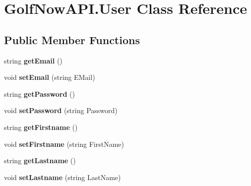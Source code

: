 \hypertarget{class_golf_now_a_p_i_1_1_user}{}\section{Golf\+Now\+A\+P\+I.\+User Class Reference}
\label{class_golf_now_a_p_i_1_1_user}
\subsection*{Public Member Functions}
\begin{DoxyCompactItemize}
\item 
\mbox{\label{class_golf_now_a_p_i_1_1_user_afcfd9d746f5d6c1c11f7cc7b5d950bd6}} 
string {\bfseries get\+Email} ()
\item 
\mbox{\label{class_golf_now_a_p_i_1_1_user_a98dcdeb86fcbbb00e965d834b9a8ce57}} 
void {\bfseries set\+Email} (string E\+Mail)
\item 
\mbox{\label{class_golf_now_a_p_i_1_1_user_a8db35d0fa78be9cd61525f66a8ac604a}} 
string {\bfseries get\+Password} ()
\item 
\mbox{\label{class_golf_now_a_p_i_1_1_user_a795f269d7d5e332e1602828a7090d8af}} 
void {\bfseries set\+Password} (string Password)
\item 
\mbox{\label{class_golf_now_a_p_i_1_1_user_ae1bf33898c6bea4b28ee14cb9d9b7ebb}} 
string {\bfseries get\+Firstname} ()
\item 
\mbox{\label{class_golf_now_a_p_i_1_1_user_a73b1ae6f350149454e0793cefe9d3d02}} 
void {\bfseries set\+Firstname} (string First\+Name)
\item 
\mbox{\label{class_golf_now_a_p_i_1_1_user_af5814ce45fd08688a3c05002ea3ef87a}} 
string {\bfseries get\+Lastname} ()
\item 
\mbox{\label{class_golf_now_a_p_i_1_1_user_a185f90645f6c97a321962ad4fb68535c}} 
void {\bfseries set\+Lastname} (string Last\+Name)
\item 

\end{DoxyCompactItemize}
